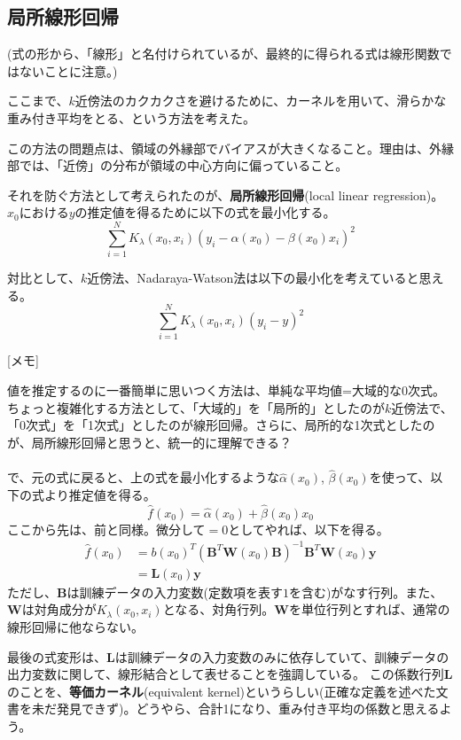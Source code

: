 \documentclass[uplatex]{jsarticle}
\begin{document}
\subsection{局所線形回帰}
(式の形から、「線形」と名付けられているが、最終的に得られる式は線形関数ではないことに注意。)

ここまで、$k$近傍法のカクカクさを避けるために、カーネルを用いて、滑らかな重み付き平均をとる、という方法を考えた。

この方法の問題点は、領域の外縁部でバイアスが大きくなること。理由は、外縁部では、「近傍」の分布が領域の中心方向に偏っていること。

それを防ぐ方法として考えられたのが、\textbf{局所線形回帰}(local linear regression)。$x_{0}$における$y$の推定値を得るために以下の式を最小化する。
\[
  \sum_{i=1}^{N}K_{\lambda}(x_{0},x_{i})(y_{i}- \alpha (x_{0})- \beta (x_{0})x_{i})^{2}
\]

対比として、$k$近傍法、Nadaraya-Watson法は以下の最小化を考えていると思える。
\[
  \sum_{i=1}^{N}K_{\lambda}(x_{0},x_{i})(y_{i}- y)^{2}
\]

[メモ]

値を推定するのに一番簡単に思いつく方法は、単純な平均値=大域的な0次式。ちょっと複雑化する方法として、「大域的」を「局所的」としたのが$k$近傍法で、「0次式」を「1次式」としたのが線形回帰。さらに、局所的な1次式としたのが、局所線形回帰と思うと、統一的に理解できる？\\\\

で、元の式に戻ると、上の式を最小化するような$\hat{\alpha}(x_{0})$, $\hat{\beta}(x_{0})$を使って、以下の式より推定値を得る。
\[
  \hat{f}(x_{0})=\hat{\alpha}(x_{0})+\hat{\beta}(x_{0})x_{0}
\]
ここから先は、前と同様。微分して$=0$としてやれば、以下を得る。
\begin{align}
  \hat{f}(x_{0})&=b(x_{0})^{T}(\mathbf{B}^{T}\mathbf{W}(x_{0})\mathbf{B})^{-1}\mathbf{B}^{T}\mathbf{W}(x_{0})\mathbf{y} \\
  &=\mathbf{L}(x_{0})\mathbf{y}
\end{align}
ただし、$\mathbf{B}$は訓練データの入力変数(定数項を表す$1$を含む)がなす行列。また、$\mathbf{W}$は対角成分が$K_{\lambda}(x_{0},x_{i})$となる、対角行列。$\mathbf{W}$を単位行列とすれば、通常の線形回帰に他ならない。

最後の式変形は、$\mathbf{L}$は訓練データの入力変数のみに依存していて、訓練データの出力変数に関して、線形結合として表せることを強調している。
この係数行列$\mathbf{L}$のことを、\textbf{等価カーネル}(equivalent kernel)というらしい(正確な定義を述べた文書を未だ発見できず)。どうやら、合計1になり、重み付き平均の係数と思えるよう。
\end{document}
